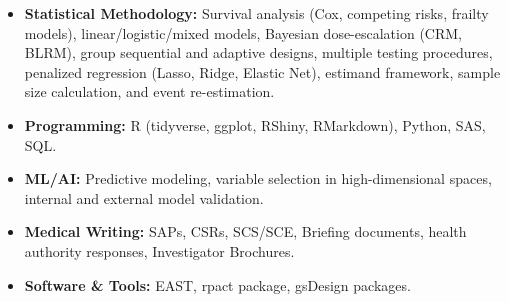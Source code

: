 %
%
%

\vspace*{.5em}
\begin{itemize}
\item[-] \textbf{Statistical Methodology:} Survival analysis (Cox, competing risks, frailty models), linear/logistic/mixed models, Bayesian dose-escalation (CRM, BLRM), group sequential and adaptive designs, multiple testing procedures, penalized regression (Lasso, Ridge, Elastic Net), estimand framework, sample size calculation, and event re-estimation.
\item[-] \textbf{Programming:} R (tidyverse, ggplot, RShiny, RMarkdown), Python, SAS, SQL.
\item[-] \textbf{ML/AI:} Predictive modeling, variable selection in high-dimensional spaces, internal and external model validation.
\item[-] \textbf{Medical Writing:} SAPs, CSRs, SCS/SCE, Briefing documents, health authority responses, Investigator Brochures.
\item[-] \textbf{Software \& Tools:} EAST, rpact package, gsDesign packages.
\end{itemize}